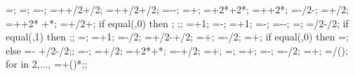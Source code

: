 {{\ssinterleftstarty=\leftwallh;
\ssinterrightstarty=\rightwallh;
\ssinterdeltax=\ssinterrightstartx-\ssinterleftstartx;
\ssinterleftdeltay=\leftwallh+\supportheight+\baselinet/2+\ssinterlinet/2;
\ssinterrightdeltay=\rightwallh+\supportheight+\baselinet/2+\ssinterlinet/2;
\markssleftstartx=-\supportwidth-\markssexspace;
\markssleftstarty=\basewalldepth+\markssexspace;
\markssdeltax=\buildingwidth+2*\supportwidth+2*\markssexspace;
\markssdeltay=\basewalldepth+\supportheight+2*\markssexspace;
\supershadestartx=-\collinet/2-\supershadespace;
\supershadestarty=\basewalldepth+\baselinet/2;
\supershadedeltax=\buildingwidth+\collinet+2*\supershadespace
 +*\showdefl;
\supershadedeltay=\superstorynumber*\storyheight+\beamlinet/2+\supershadespace;
if equal(\showlessbays,0) then {
;
;};
\startcol=\leftbays+1;
\endcol=\columnnumber-\rightbays;
\startbeam=\leftbays+1;
\endbeam=\baynumber-\rightbays;
\superbays=\baynumber-\leftbays-\rightbays;
\superwidth=\superbays*\baywidth;
\groundbeamshifty=\groundbeamlinet/2-\baselinet/2;
if equal(\showdefl,1) then {;};
\shearwallstartcolumn=\shearwallbay;
\shearwallendcolumn=\shearwallbay+1;
\shearwallstartx=\x{\shearwallstartcolumn}-\collinet/2;
\shearwallstarty=+\baselinet/2-+\shearwalllinet/2;
\shearwalldeltax=\baywidth+\collinet;
\shearwallsupportstartx=\shearwallstartx-\supportwidth/2;
\shearwallsupportdeltax=\shearwalldeltax+\supportwidth;
if equal(\superstorynumber,0) then {
\shearwalldeltay=\y{\levelnumber};} else
{\shearwalldeltay=\y{\levelnumber}-\shearwallstarty
+\beamlinet/2-\shearwalllinet/2;};
\marksuperleftstartx=\x{\startcol}-\marksuperexspace;
\marksuperleftstarty=\basewalldepth+\marksuperexspace/2;
\marksuperdeltax=\superwidth+2*\marksuperexspace+*\showdefl;
\marksuperdeltay=\y{\levelnumber}-+\marksuperexspace/2;
\rightwallspringstartx=\buildingwidth+\supportwidth;
\rightwallspringstarty=\rightwallh;
\rightwallspringendx=\buildingwidth+\supportwidth;
\rightwallspringendy=-\supportheight;
=-\supportwidth/2;
\bottomlength=\buildingwidth+\supportwidth;
\botpinspace=\bottomlength/();
for \ibot in {2,...,{\nbotpin}}{
	\botpinx{\ibot}=+()*\botpinspace;};
}   %




}
